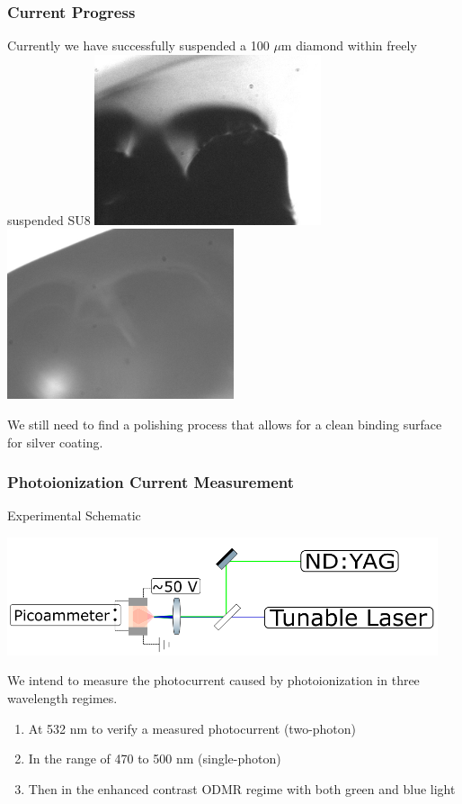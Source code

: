 \documentclass{beamer}
\begin{document}
\begin{frame}\frametitle{Current Progress}
    Currently we have successfully suspended a 100 $\mu$m diamond within freely suspended SU8
    \includegraphics[width=0.5\textwidth]{Images/Dia1.jpg}
    \includegraphics[width=0.5\textwidth]{Images/Dia2.jpg}

    We still need to find a polishing process that allows for a clean binding surface for silver coating.
\end{frame}

\begin{frame}\frametitle{Photoionization Current Measurement}
    \begin{block}{Experimental Schematic}
        \begin{center}
            \includegraphics[width=0.95\textwidth]{Images/WP1Schematic.png}
        \end{center}
        We intend to measure the photocurrent caused by photoionization in three wavelength regimes.
        \begin{enumerate}
            \item At 532 nm to verify a measured photocurrent (two-photon)
            \item In the range of 470 to 500 nm (single-photon)
            \item Then in the enhanced contrast ODMR regime with both green and blue light
        \end{enumerate}
    \end{block}
\end{frame}
\end{document}
